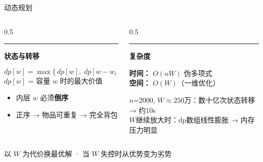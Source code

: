 \documentclass[9pt]{ctexbeamer}
\newenvironment{leftblock}[1]{%
  \vspace{0.3cm}
  \begin{beamercolorbox}[wd=\textwidth,leftskip=0.4cm,rightskip=0.4cm]{}
    \textcolor{ember}{\rule{2.5pt}{0.55cm}}\hspace{0.2cm}
    {\bfseries\color{ink}#1}
    \par\vspace{0.1cm}
    \hspace{0.35cm}\begin{minipage}{\dimexpr\textwidth-1.2cm\relax}
}{%
    \end{minipage}
  \end{beamercolorbox}
  \vspace{0.15cm}
}
\newcommand{\hi}[1]{\textcolor{ember}{\textbf{#1}}}
\begin{document}
\begin{frame}{动态规划}

\begin{columns}[T]
\begin{column}{0.5\textwidth}
\begin{leftblock}{状态与转移}
\[\boxed{dp[w] = \max\{\, dp[w],\; dp[w-w_i] + v_i \,\}}\]
$dp[w]$ = 容量 $w$ 时的最大价值
\end{leftblock}

\vspace{0.1cm}
\begin{itemize}
  \item 内层 $w$ 必须\hi{倒序}
  \item 正序 → 物品可重复 → 完全背包
\end{itemize}
\end{column}

\begin{column}{0.5\textwidth}
\begin{leftblock}{复杂度}
\textbf{时间：} \hi{$O(nW)$} 伪多项式 \\
\textbf{空间：} $O(W)$（一维优化）

\vspace{0.12cm}
{\footnotesize\color{slate}
$n$=2000, $W\approx250$万：数十亿次状态转移 → 约10s \\
$W$继续放大时：dp数组线性膨胀 → 内存压力明显
}
\end{leftblock}
\end{column}
\end{columns}

\vspace{0.2cm}
\begin{center}
{\small\color{slate}以 $W$ 为代价换最优解 · 当 $W$ 失控时从优势变为劣势}
\end{center}

\end{frame}
\end{document}

